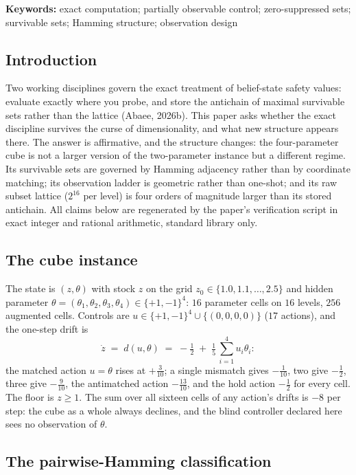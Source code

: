 \documentclass[10pt,twocolumn]{article}
\theoremstyle{plain}
\theoremstyle{definition}
\theoremstyle{remark}
\begin{document}
\textbf{Keywords:} exact computation; partially observable control;
zero-suppressed sets; survivable sets; Hamming structure; observation
design

\subsection{Introduction}\label{introduction}

Two working disciplines govern the exact treatment of belief-state safety values: evaluate exactly where you probe, and store the antichain of maximal survivable sets rather than the lattice (Abaee, 2026b). This paper asks whether the exact discipline survives the curse of dimensionality, and what new structure appears there. The answer is affirmative, and the structure changes: the four-parameter cube is not a larger version of the two-parameter instance but a different regime.
Its survivable sets are governed by Hamming adjacency rather than by
coordinate matching; its observation ladder is geometric rather than
one-shot; and its raw subset lattice (\(2^{16}\) per level) is four
orders of magnitude larger than its stored antichain. All claims below
are regenerated by the paper's verification script in exact integer
and rational arithmetic, standard library only.

\subsection{The cube instance}\label{instance}

The state is \((z, \theta)\) with stock \(z\) on the grid
\(z_{0} \in \{1.0, 1.1, \dots, 2.5\}\) and hidden parameter
\(\theta = (\theta_{1}, \theta_{2}, \theta_{3}, \theta_{4}) \in
\{+1, -1\}^{4}\): \(16\) parameter cells on \(16\) levels, \(256\)
augmented cells. Controls are \(u \in \{+1,-1\}^{4} \cup \{(0,0,0,0)\}\)
(\(17\) actions), and the one-step drift is
\[
\dot z \;=\; d(u, \theta) \;=\; -\tfrac12
\;+\; \tfrac15\,\textstyle\sum_{i=1}^{4} u_{i}\theta_{i}:
\]
the matched action \(u = \theta\) rises at \(+\tfrac3{10}\); a single
mismatch gives \(-\tfrac1{10}\), two give \(-\tfrac12\), three give
\(-\tfrac9{10}\), the antimatched action \(-\tfrac{13}{10}\), and the
hold action \(-\tfrac12\) for every cell. The floor is \(z \ge 1\).
The sum over all sixteen cells of any action's drifts is \(-8\) per
step: the cube as a whole always declines, and the blind controller
declared here sees no observation of \(\theta\).

\subsection{The pairwise-Hamming classification}\label{hamming}
\end{document}
